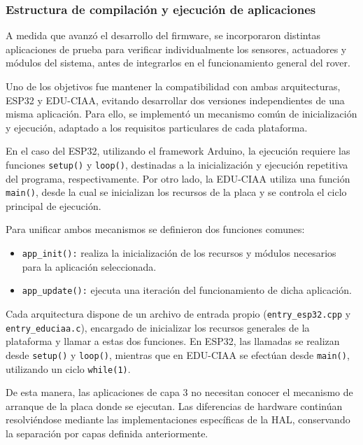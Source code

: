 \subsubsection{Estructura de compilación y ejecución de aplicaciones}

A medida que avanzó el desarrollo del firmware, se incorporaron distintas aplicaciones de prueba para verificar individualmente los sensores, actuadores y módulos del sistema, antes de integrarlos en el funcionamiento general del rover.

Uno de los objetivos fue mantener la compatibilidad con ambas arquitecturas, ESP32 y EDU-CIAA, evitando desarrollar dos versiones independientes de una misma aplicación. Para ello, se implementó un mecanismo común de inicialización y ejecución, adaptado a los requisitos particulares de cada plataforma.

En el caso del ESP32, utilizando el framework Arduino, la ejecución requiere las funciones \texttt{setup()} y \texttt{loop()}, destinadas a la inicialización y ejecución repetitiva del programa, respectivamente. Por otro lado, la EDU-CIAA utiliza una función \texttt{main()}, desde la cual se inicializan los recursos de la placa y se controla el ciclo principal de ejecución.

Para unificar ambos mecanismos se definieron dos funciones comunes:

\begin{itemize}
	\item \texttt{app\_init():} realiza la inicialización de los recursos y módulos necesarios para la aplicación seleccionada.
	\item \texttt{app\_update():} ejecuta una iteración del funcionamiento de dicha aplicación.
\end{itemize}

Cada arquitectura dispone de un archivo de entrada propio (\texttt{entry\_esp32.cpp} y \texttt{entry\_educiaa.c}), encargado de inicializar los recursos generales de la plataforma y llamar a estas dos funciones. En ESP32, las llamadas se realizan desde \texttt{setup()} y \texttt{loop()}, mientras que en EDU-CIAA se efectúan desde \texttt{main()}, utilizando un ciclo \texttt{while(1)}.

De esta manera, las aplicaciones de capa 3 no necesitan conocer el mecanismo de arranque de la placa donde se ejecutan. Las diferencias de hardware continúan resolviéndose mediante las implementaciones específicas de la HAL, conservando la separación por capas definida anteriormente.

